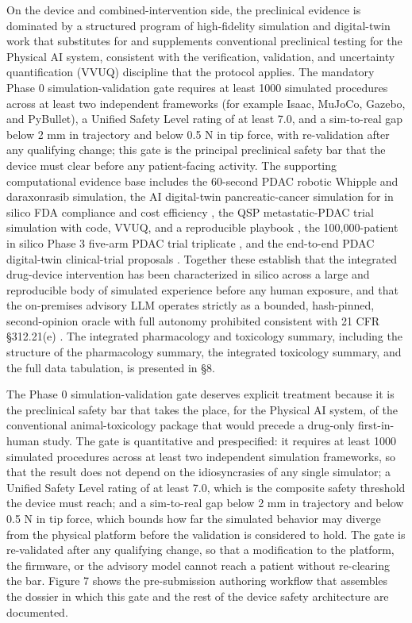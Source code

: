 On the device and combined-intervention side, the preclinical evidence is dominated
by a structured program of high-fidelity simulation and digital-twin work that
substitutes for and supplements conventional preclinical testing for the Physical AI
system, consistent with the verification, validation, and uncertainty
quantification (VVUQ) discipline that the protocol applies. The mandatory Phase 0
simulation-validation gate requires at least 1000 simulated procedures across at
least two independent frameworks (for example Isaac, MuJoCo, Gazebo, and PyBullet),
a Unified Safety Level rating of at least 7.0, and a sim-to-real gap below 2 mm in
trajectory and below 0.5 N in tip force, with re-validation after any qualifying
change; this gate is the principal preclinical safety bar that the device must clear
before any patient-facing activity. The supporting computational evidence base
includes the 60-second PDAC robotic Whipple and daraxonrasib simulation, the AI
digital-twin pancreatic-cancer simulation for in silico FDA compliance and cost
efficiency \cite{fdadigtwinpc}, the QSP metastatic-PDAC trial simulation with code,
VVUQ, and a reproducible playbook \cite{qspmetpancre}, the 100,000-patient in silico
Phase 3 five-arm PDAC trial triplicate \cite{chatgpt100kp}, and the end-to-end PDAC
digital-twin clinical-trial proposals \cite{pdacdigtwinp}. Together these establish
that the integrated drug-device intervention has been characterized in silico across
a large and reproducible body of simulated experience before any human exposure, and
that the on-premises advisory LLM operates strictly as a bounded, hash-pinned,
second-opinion oracle with full autonomy prohibited consistent with 21 CFR
\S 312.21(e) \cite{clintrustpai, congress9510}. The integrated pharmacology and
toxicology summary, including the structure of the pharmacology summary, the
integrated toxicology summary, and the full data tabulation, is presented in \S 8.

The Phase 0 simulation-validation gate deserves explicit treatment because it is the
preclinical safety bar that takes the place, for the Physical AI system, of the
conventional animal-toxicology package that would precede a drug-only first-in-human
study. The gate is quantitative and prespecified: it requires at least 1000 simulated
procedures across at least two independent simulation frameworks, so that the result
does not depend on the idiosyncrasies of any single simulator; a Unified Safety Level
rating of at least 7.0, which is the composite safety threshold the device must reach;
and a sim-to-real gap below 2 mm in trajectory and below 0.5 N in tip force, which
bounds how far the simulated behavior may diverge from the physical platform before
the validation is considered to hold. The gate is re-validated after any qualifying
change, so that a modification to the platform, the firmware, or the advisory model
cannot reach a patient without re-clearing the bar. Figure 7 shows the pre-submission
authoring workflow that assembles the dossier in which this gate and the rest of the
device safety architecture are documented.

